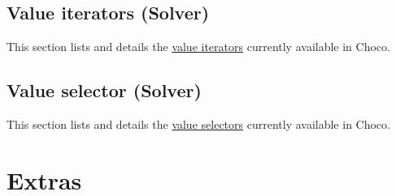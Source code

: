 \chapter{Value iterators (Solver)}\label{ch:valite}\hypertarget{ch:valite}{}
This section lists and details the \hyperlink{solver:valueiterator}{value iterators} currently available in Choco.





\chapter{Value selector (Solver)}\label{ch:valsel}\hypertarget{ch:valsel}{}
This section lists and details the \hyperlink{solver:valueselector}{value selectors} currently available in Choco.











\part{Extras}\label{ch:extra}\hypertarget{ch:extra}{}



